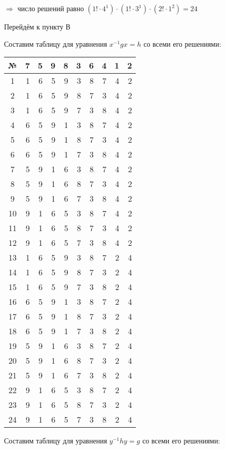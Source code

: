 \documentclass[utf8,14pt,a4paper,oneside,russian]{book}
\begin{document}
	$\Rightarrow$ число решений равно $(1!\cdot4^{1})\cdot(1!\cdot3^{1})\cdot(2!\cdot1^{2})=24$
	
	\vspace{\baselineskip}
	
	Перейдём к пункту В
	
	Составим таблицу для уравнения $x^{-1}gx=h$ со всеми его решениями:
	
	\vspace{\baselineskip}

	\begin{longtable}{c|rrrr|rrr|r|r}
		№&7&5&9&8&3&6&4&1&2\\\hline
		1&1&6&5&9&3&8&7&4&2\\
		2&1&6&5&9&8&7&3&4&2\\
		3&1&6&5&9&7&3&8&4&2\\
		4&6&5&9&1&3&8&7&4&2\\
		5&6&5&9&1&8&7&3&4&2\\
		6&6&5&9&1&7&3&8&4&2\\
		7&5&9&1&6&3&8&7&4&2\\
		8&5&9&1&6&8&7&3&4&2\\
		9&5&9&1&6&7&3&8&4&2\\
		10&9&1&6&5&3&8&7&4&2\\
		11&9&1&6&5&8&7&3&4&2\\
		12&9&1&6&5&7&3&8&4&2\\
		13&1&6&5&9&3&8&7&2&4\\
		14&1&6&5&9&8&7&3&2&4\\
		15&1&6&5&9&7&3&8&2&4\\
		16&6&5&9&1&3&8&7&2&4\\
		17&6&5&9&1&8&7&3&2&4\\
		18&6&5&9&1&7&3&8&2&4\\
		19&5&9&1&6&3&8&7&2&4\\
		20&5&9&1&6&8&7&3&2&4\\
		21&5&9&1&6&7&3&8&2&4\\
		22&9&1&6&5&3&8&7&2&4\\
		23&9&1&6&5&8&7&3&2&4\\
		24&9&1&6&5&7&3&8&2&4\\
	\end{longtable}
	
	Составим таблицу для уравнения $y^{-1}hy=g$ со всеми его решениями:
	
	\vspace{\baselineskip}
\end{document}
